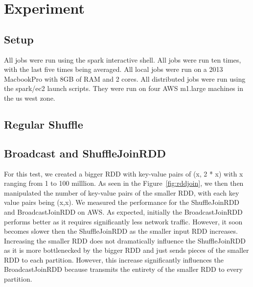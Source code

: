 \chapter{Experiment}

\section{Setup}

All jobs were run using the spark interactive shell.
All jobs were run ten times, with the last five times being averaged.
All local jobs were run on a 2013 MacbookPro with 8GB of RAM and 2 cores.
All distributed jobs were run using the spark/ec2 launch scripts. They were run on 
four AWS m1.large machines in the us west zone. 

\section{Regular Shuffle}


\section{Broadcast and ShuffleJoinRDD}

For this test, we created a bigger RDD with key-value pairs of (x, 2 * x) with x ranging from 1 to 100 milllion.
As seen in the Figure~\ref{fig:rddjoin}, we then then manipulated the number of key-value pairs of the smaller RDD, 
with each key value pairs being (x,x). We measured the performance for the ShuffleJoinRDD and BroadcastJoinRDD on AWS. 
As expected, initially the BroadcastJoinRDD performs better as it requires significantly less network traffic.
However, it soon becomes slower then the ShuffleJoinRDD as the smaller input RDD increases.
Increasing the smaller RDD does not dramatically influence the ShuffleJoinRDD as it is more bottlenecked by the bigger RDD and just
sends pieces of the smaller RDD to each partition. However, this increase significantly influences the BroadcastJoinRDD 
because transmits the entirety of the smaller RDD to every partition.

